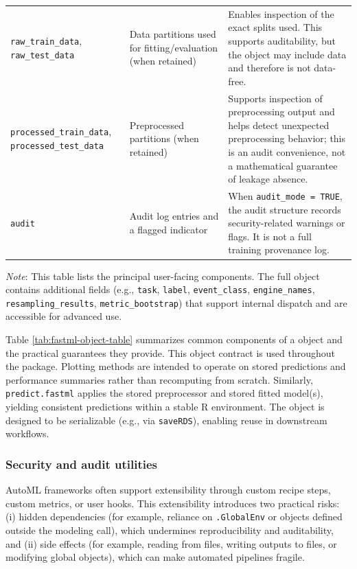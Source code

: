 \begin{table}
\begin{tabular}[t]{lll}
\texttt{raw\_train\_data}, \texttt{raw\_test\_data} & Data partitions used for fitting/evaluation (when retained) & Enables inspection of the exact splits used. This supports auditability, but the object may include data and therefore is not data-free.\\
\texttt{processed\_train\_data}, \texttt{processed\_test\_data} & Preprocessed partitions (when retained) & Supports inspection of preprocessing output and helps detect unexpected preprocessing behavior; this is an audit convenience, not a mathematical guarantee of leakage absence.\\
\texttt{audit} & Audit log entries and a flagged indicator & When \texttt{audit\_mode = TRUE}, the audit structure records security-related warnings or flags. It is not a full training provenance log.\\
\bottomrule
\end{tabular}
\end{table}

\emph{Note}: This table lists the principal user-facing components. The full object contains additional fields (e.g., \texttt{task}, \texttt{label}, \texttt{event\_class}, \texttt{engine\_names}, \texttt{resampling\_results}, \texttt{metric\_bootstrap}) that support internal dispatch and are accessible for advanced use.

Table \ref{tab:fastml-object-table} summarizes common components of a  object and the practical guarantees they provide. This object contract is used throughout the package. Plotting methods are intended to operate on stored predictions and performance summaries rather than recomputing from scratch. Similarly, \texttt{predict.fastml} applies the stored preprocessor and stored fitted model(s), yielding consistent predictions within a stable R environment. The object is designed to be serializable (e.g., via \texttt{saveRDS}), enabling reuse in downstream workflows.

\subsubsection{Security and audit utilities}\label{security-and-audit-utilities}

AutoML frameworks often support extensibility through custom recipe steps, custom metrics, or user hooks. This extensibility introduces two practical risks: (i) hidden dependencies (for example, reliance on \texttt{.GlobalEnv} or objects defined outside the modeling call), which undermines reproducibility and auditability, and (ii) side effects (for example, reading from files, writing outputs to files, or modifying global objects), which can make automated pipelines fragile.

